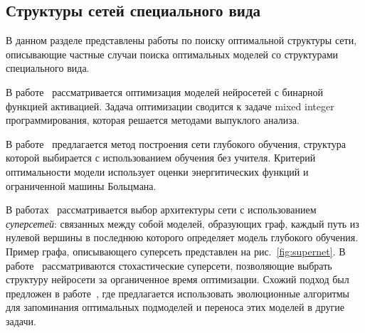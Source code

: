 \subsection*{Структуры сетей специального вида}
В данном разделе представлены работы по поиску оптимальной структуры сети, описывающие частные случаи поиска оптимальных моделей со структурами специального вида.

В работе~\cite{mixed} рассматривается оптимизация моделей нейросетей с бинарной функцией активацией. Задача оптимизации сводится к задаче mixed integer программирования, которая решается методами выпуклого анализа.



В работе~\cite{energynet} предлагается метод построения сети глубокого обучения, структура которой выбирается с использованием обучения без учителя. Критерий оптимальности модели использует оценки энергитических функций и ограниченной машины Больцмана.

В работах~\cite{pathnet, supernet} рассматривается выбор архитектуры сети с использованием \textit{суперсетей}: связанных между собой моделей, образующих граф, каждый  путь из нулевой вершины в последнюю которого определяет модель глубокого обучения. Пример графа, описывающего суперсеть представлен на рис.~\ref{fig:supernet}. В работе~\cite{supernet} рассматриваются стохастические суперсети, позволяющие выбрать структуру нейросети за органиченное время оптимизации. 
Схожий подход был предложен в работе~\cite{pathnet}, где предлагается использовать эволюционные алгоритмы для запоминания оптимальных подмоделей и переноса этих моделей в другие задачи.


